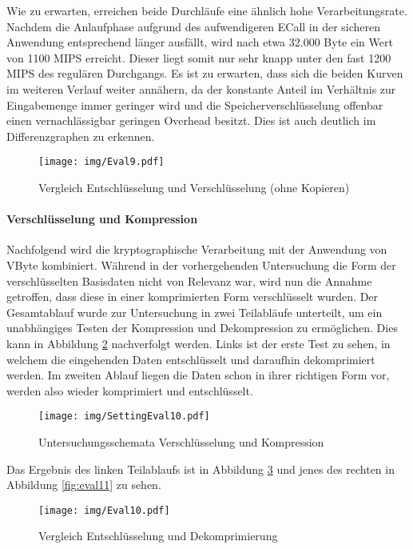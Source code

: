 Wie zu erwarten, erreichen beide Durchläufe eine ähnlich hohe Verarbeitungsrate. Nachdem die Anlaufphase aufgrund des aufwendigeren \ac{ECall} in der sicheren Anwendung entsprechend länger ausfällt, wird nach etwa 32.000 Byte ein Wert von 1100 \ac{MIPS} erreicht. Dieser liegt somit nur sehr knapp unter den fast 1200 \ac{MIPS} des regulären Durchgangs. Es ist zu erwarten, dass sich die beiden Kurven im weiteren Verlauf weiter annähern, da der konstante Anteil im Verhältnis zur Eingabemenge immer geringer wird und die Speicherverschlüsselung offenbar einen vernachlässigbar geringen Overhead besitzt. Dies ist auch deutlich im Differenzgraphen zu erkennen.

\begin{figure}[H]
	\texttt{[image: img/Eval9.pdf]}
	\centering
	\caption{Vergleich Entschlüsselung und Verschlüsselung (ohne Kopieren)}
	\label{fig:eval9}
\end{figure}

\paragraph{Verschlüsselung und Kompression}

Nachfolgend wird die kryptographische Verarbeitung mit der Anwendung von VByte kombiniert. Während in der vorhergehenden Untersuchung die Form der verschlüsselten Basisdaten nicht von Relevanz war, wird nun die Annahme getroffen, dass diese in einer komprimierten Form verschlüsselt wurden. Der Gesamtablauf wurde zur Untersuchung in zwei Teilabläufe unterteilt, um ein unabhängiges Testen der Kompression und Dekompression zu ermöglichen. Dies kann in Abbildung \ref{fig:settingeval10} nachverfolgt werden. Links ist der erste Test zu sehen, in welchem die eingehenden Daten entschlüsselt und daraufhin dekomprimiert werden. Im zweiten Ablauf liegen die Daten schon in ihrer richtigen Form vor, werden also wieder komprimiert und entschlüsselt.

\begin{figure}[H]
	\texttt{[image: img/SettingEval10.pdf]}
	\centering
	\caption{Untersuchungsschemata Verschlüsselung und Kompression}
	\label{fig:settingeval10}
\end{figure}

\noindent Das Ergebnis des linken Teilablaufs ist in Abbildung \ref{fig:eval10} und jenes des rechten in Abbildung \ref{fig:eval11} zu sehen.

\begin{figure}[H]
	\texttt{[image: img/Eval10.pdf]}
	\centering
	\caption{Vergleich Entschlüsselung und Dekomprimierung}
	\label{fig:eval10}
\end{figure}

